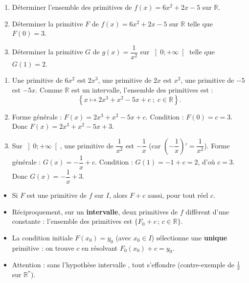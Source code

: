 \documentclass[11pt]{article}
\begin{document}
\begin{exercice}
\begin{enumerate}
\item Déterminer l'ensemble des primitives de $f(x) = 6x^2 + 2x - 5$ sur $\mathbb{R}$.
\item Déterminer la primitive $F$ de $f(x) = 6x^2 + 2x - 5$ sur $\mathbb{R}$ telle que $F(0) = 3$.
\item Déterminer la primitive $G$ de $g(x) = \dfrac{1}{x^2}$ sur $\left]0 ; +\infty\right[$ telle que $G(1) = 2$.
\end{enumerate}
\end{exercice}

\begin{corrige}[Exercice]
\begin{enumerate}
\item Une primitive de $6x^2$ est $2x^3$, une primitive de $2x$ est $x^2$, une primitive de $-5$ est $-5x$. Comme $\mathbb{R}$ est un intervalle, l'ensemble des primitives est :
\[ \left\lbrace x \mapsto 2x^3 + x^2 - 5x + c \; ; \; c \in \mathbb{R} \right\rbrace. \]
\item Forme générale : $F(x) = 2x^3 + x^2 - 5x + c$. Condition : $F(0) = c = 3$. Donc $F(x) = 2x^3 + x^2 - 5x + 3$.
\item Sur $\left]0 ; +\infty\right[$, une primitive de $\dfrac{1}{x^2}$ est $-\dfrac{1}{x}$ (car $\left(-\dfrac{1}{x}\right)' = \dfrac{1}{x^2}$). Forme générale : $G(x) = -\dfrac{1}{x} + c$. Condition : $G(1) = -1 + c = 2$, d'où $c = 3$. Donc $G(x) = -\dfrac{1}{x} + 3$.
\end{enumerate}
\end{corrige}

\begin{aretenir}
\begin{itemize}
\item Si $F$ est une primitive de $f$ sur $I$, alors $F + c$ aussi, pour tout réel $c$.
\item Réciproquement, sur un \textbf{intervalle}, deux primitives de $f$ diffèrent d'une constante : l'ensemble des primitives est $\{F_0 + c \, ; \, c \in \mathbb{R}\}$.
\item La condition initiale $F(x_0) = y_0$ (avec $x_0 \in I$) sélectionne une \textbf{unique} primitive : on trouve $c$ en résolvant $F_0(x_0) + c = y_0$.
\item Attention : sans l'hypothèse \og intervalle \fg{}, tout s'effondre (contre-exemple de $\frac{1}{x}$ sur $\mathbb{R}^*$).
\end{itemize}
\end{aretenir}
\end{document}
